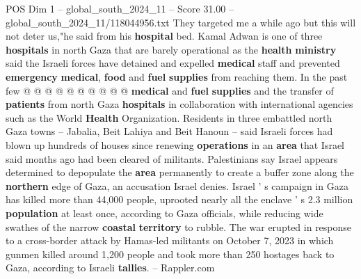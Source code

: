 \begin{textsample}{POS Dim 1 – global\_south\_2024\_11 – Score 31.00 – global\_south\_2024\_11/118044956.txt}
They targeted me a while ago but this will not deter us,"he said from his \textbf{hospital} bed.
Kamal Adwan is one of three \textbf{hospitals} in north Gaza that are barely operational as the \textbf{health} \textbf{ministry} said the Israeli forces have detained and expelled \textbf{medical} staff and prevented \textbf{emergency} \textbf{medical}, \textbf{food} and \textbf{fuel} \textbf{supplies} from reaching them.
In the past few @ @ @ @ @ @ @ @ @ @ \textbf{medical} and \textbf{fuel} \textbf{supplies} and the transfer of \textbf{patients} from north Gaza \textbf{hospitals} in collaboration with international agencies such as the World \textbf{Health} Organization.
Residents in three embattled north Gaza towns -- Jabalia, Beit Lahiya and Beit Hanoun -- said Israeli forces had blown up hundreds of houses since renewing \textbf{operations} in an \textbf{area} that Israel said months ago had been cleared of militants.
Palestinians say Israel appears determined to depopulate the \textbf{area} permanently to create a buffer zone along the \textbf{northern} edge of Gaza, an accusation Israel denies.
Israel ' s campaign in Gaza has killed more than 44,000 people, uprooted nearly all the enclave ' s 2.3 million \textbf{population} at least once, according to Gaza officials, while reducing wide swathes of the narrow \textbf{coastal} \textbf{territory} to rubble.
The war erupted in response to a cross-border attack by Hamas-led militants on October 7, 2023 in which gunmen killed around 1,200 people and took more than 250 hostages back to Gaza, according to Israeli \textbf{tallies}. -- Rappler.com

\end{textsample}

